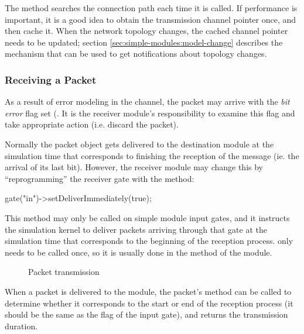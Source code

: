 \begin{ned}
The  method searches the connection path each
time it is called. If performance is important, it is a good idea to obtain
the transmission channel pointer once, and then cache it. When the network topology
changes, the cached channel pointer needs to be updated; section
\ref{sec:simple-modules:model-change} describes the mechanism that can
be used to get notifications about topology changes.

\subsubsection{Receiving a Packet}
\label{sec:simple-modules:receiving-a-packet}

As a result of error modeling in the channel, the packet may arrive
with the \textit{bit error} flag set (.
It is the receiver module's responsibility to examine this flag
and take appropriate action (i.e. discard the packet).

Normally the packet object gets delivered to the destination module
at the simulation time that corresponds to finishing the reception
of the message (ie. the arrival of its last bit). However, the receiver
module may change this by ``reprogramming'' the receiver gate with
the  method:

\begin{cpp}
gate("in")->setDeliverImmediately(true);
\end{cpp}

This method may only be called on simple module input gates, and it
instructs the simulation kernel to deliver packets arriving through
that gate at the simulation time that corresponds to the
beginning of the reception process.
 only needs to be called once,
so it is usually done in the  method of the module.

\begin{figure}[htbp]
  \begin{center}
    
    \caption{Packet transmission}
    \label{fig:ch-simple-modules:transmission}
  \end{center}
\end{figure}

When a packet is delivered to the module, the packet's
 method can be called to determine
whether it corresponds to the start or end of the reception
process (it should be the same as the 
flag of the input gate), and  returns the transmission
duration.


\end{ned}
